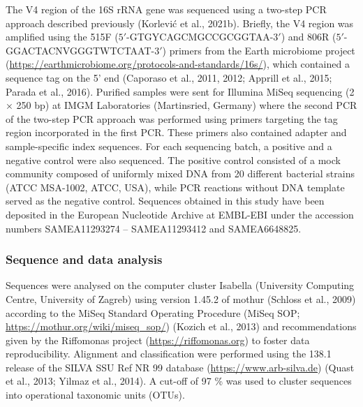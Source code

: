 \documentclass[12pt,]{article}
\begin{document}
The V4 region of the 16S rRNA gene was sequenced using a two-step PCR
approach described previously (Korlević et al., 2021b). Briefly, the V4
region was amplified using the 515F (\(5'\)-GTGYCAGCMGCCGCGGTAA-\(3'\))
and 806R (\(5'\)-GGACTACNVGGGTWTCTAAT-\(3'\)) primers from the Earth
microbiome project
(\url{https://earthmicrobiome.org/protocols-and-standards/16s/}), which
contained a sequence tag on the 5' end (Caporaso et al., 2011, 2012;
Apprill et al., 2015; Parada et al., 2016). Purified samples were sent
for Illumina MiSeq sequencing (2 × 250 bp) at IMGM Laboratories
(Martinsried, Germany) where the second PCR of the two-step PCR approach
was performed using primers targeting the tag region incorporated in the
first PCR. These primers also contained adapter and sample-specific
index sequences. For each sequencing batch, a positive and a negative
control were also sequenced. The positive control consisted of a mock
community composed of uniformly mixed DNA from 20 different bacterial
strains (ATCC MSA-1002, ATCC, USA), while PCR reactions without DNA
template served as the negative control. Sequences obtained in this
study have been deposited in the European Nucleotide Archive at EMBL-EBI
under the accession numbers SAMEA11293274 -- SAMEA11293412 and
SAMEA6648825.

\hypertarget{sequence-and-data-analysis}{%
\subsubsection{Sequence and data
analysis}\label{sequence-and-data-analysis}}

Sequences were analysed on the computer cluster Isabella (University
Computing Centre, University of Zagreb) using version 1.45.2 of mothur
(Schloss et al., 2009) according to the MiSeq Standard Operating
Procedure (MiSeq SOP; \url{https://mothur.org/wiki/miseq_sop/}) (Kozich
et al., 2013) and recommendations given by the Riffomonas project
(\url{https://riffomonas.org}) to foster data reproducibility. Alignment
and classification were performed using the 138.1 release of the SILVA
SSU Ref NR 99 database (\url{https://www.arb-silva.de}) (Quast et al.,
2013; Yilmaz et al., 2014). A cut-off of 97 \% was used to cluster
sequences into operational taxonomic units (OTUs).
\end{document}
